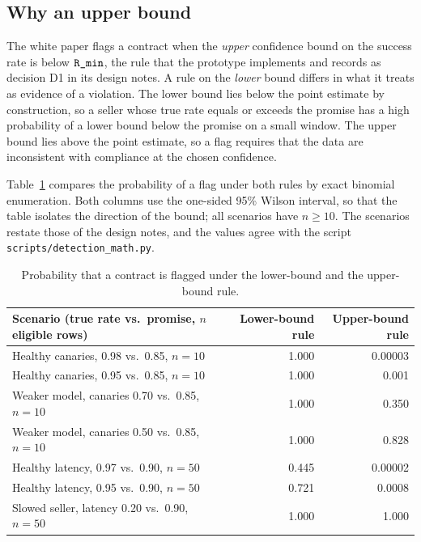 \subsection{Why an upper bound}
\label{sec:lower_vs_upper}

The white paper flags a contract when the \emph{upper} confidence bound on the
success rate is below $\textnormal{\texttt{R\_min}}$, the rule that the prototype implements and
records as decision D1 in its design notes. A rule on the \emph{lower} bound
differs in what it treats as evidence of a violation. The lower bound lies below
the point estimate by construction, so a seller whose true rate equals or
exceeds the promise has a high probability of a lower bound below the promise
on a small window. The upper bound lies above the point estimate, so a flag
requires that the data are inconsistent with compliance at the chosen
confidence.

Table~\ref{tab:rules} compares the probability of a flag under both rules by
exact binomial enumeration. Both columns use the one-sided 95\% Wilson interval,
so that the table isolates the direction of the bound; all scenarios have
$n \geq 10$. The scenarios restate those of the design notes, and the values
agree with the script \texttt{scripts/detection\_math.py}.

\begin{table}[htbp]
  \centering
  \small
  \begin{tabularx}{\linewidth}{@{}Xrr@{}}
    \toprule
    Scenario (true rate vs.\ promise, $n$ eligible rows) & Lower-bound rule &
      Upper-bound rule \\
    \midrule
    Healthy canaries, 0.98 vs.\ 0.85, $n = 10$ & 1.000 & 0.00003 \\
    Healthy canaries, 0.95 vs.\ 0.85, $n = 10$ & 1.000 & 0.001 \\
    Weaker model, canaries 0.70 vs.\ 0.85, $n = 10$ & 1.000 & 0.350 \\
    Weaker model, canaries 0.50 vs.\ 0.85, $n = 10$ & 1.000 & 0.828 \\
    Healthy latency, 0.97 vs.\ 0.90, $n = 50$ & 0.445 & 0.00002 \\
    Healthy latency, 0.95 vs.\ 0.90, $n = 50$ & 0.721 & 0.0008 \\
    Slowed seller, latency 0.20 vs.\ 0.90, $n = 50$ & 1.000 & 1.000 \\
    \bottomrule
  \end{tabularx}
  \caption{Probability that a contract is flagged under the lower-bound and the
  upper-bound rule.}
  \label{tab:rules}
\end{table}


